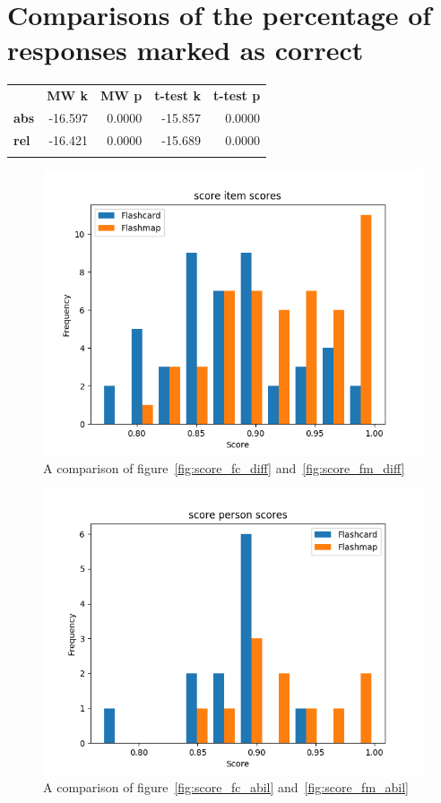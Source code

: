 \FloatBarrier
\section{Comparisons of the percentage of responses marked as correct}

\begin{longtable}[c]{@{}lrrrr@{}}
\toprule\addlinespace
& \textbf{MW k} & \textbf{MW p} &
\textbf{t-test k} & \textbf{t-test p}
\\\addlinespace
\midrule
\textbf{abs} & -16.597 & 0.0000 & -15.857 & 0.0000
\\\addlinespace
\textbf{rel} & -16.421 & 0.0000 & -15.689 & 0.0000
\\\addlinespace
\bottomrule
    \label{tab:score_comp}
\end{longtable}

\begin{figure}
    \centering
    \includegraphics[width=.7\textwidth]{img/score_diff.png}
    \caption{A comparison of figure~\protect\ref{fig:score_fc_diff} and~\protect\ref{fig:score_fm_diff}}
    \label{fig:score_diff}
\end{figure}
\begin{figure}
    \centering
    \includegraphics[width=.7\textwidth]{img/score_abil.png}
    \caption{A comparison of figure~\protect\ref{fig:score_fc_abil} and~\protect\ref{fig:score_fm_abil}}
    \label{fig:score_abil}
\end{figure}

